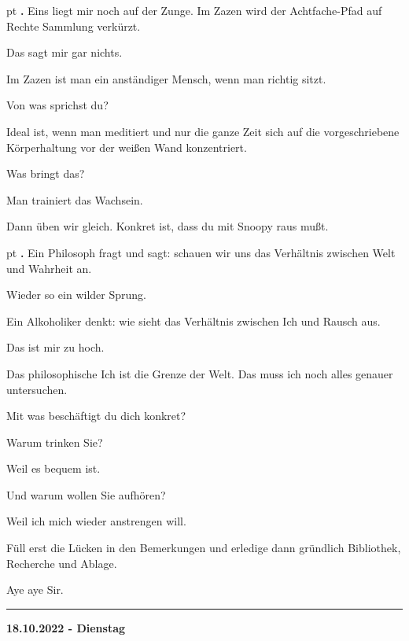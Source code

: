 \documentclass[10pt,a4paper]{article}
\newcounter{notec}
\newcommand\notep[1]{%
  \stepcounter{notec}
  \vskip #1pt
  {\bf\arabic{notec}.}
}
\newcommand\rele[1] {{\color {english} \bf {#1}}}         %
\newcommand\ddivide {\vskip -9pt \hrule \vskip 6pt}
\begin{document}
\begin{mdframed}[style=daystyle]
  \notep 4 Eins liegt mir noch auf der Zunge. Im Zazen wird der Achtfache-Pfad auf
  Rechte Sammlung verkürzt.

  \vskip 2pt
  Das sagt mir gar nichts.

  \vskip 2pt
  Im Zazen ist man ein anständiger Mensch, wenn man richtig sitzt.

  \vskip 2pt
  Von was sprichst du?

  \vskip 2pt
  Ideal ist, wenn man meditiert und nur die ganze Zeit sich auf die
  vorgeschriebene Körperhaltung vor der weißen Wand konzentriert.

  \vskip 2pt
  Was bringt das?

  \vskip 2pt
  Man trainiert das Wachsein.

  \vskip 2pt
  Dann üben wir gleich. Konkret ist, dass du mit Snoopy raus mußt.


  \notep 4 Ein Philosoph fragt und sagt: schauen wir uns das Verhältnis zwischen Welt und Wahrheit an.

  \vskip 2pt
  Wieder so ein wilder Sprung.

  \vskip 2pt
  Ein Alkoholiker denkt: wie sieht das Verhältnis zwischen Ich und Rausch aus.

  \vskip 2pt
  Das ist mir zu hoch.

  \vskip 2pt
  Das philosophische Ich ist die Grenze der Welt. Das muss ich noch alles genauer untersuchen.

  \vskip 2pt
  Mit was beschäftigt du dich konkret?

  \vskip 2pt
  Warum trinken Sie?

  \vskip 2pt
  Weil es bequem ist.

  \vskip 2pt
  Und warum wollen Sie aufhören?

  \vskip 2pt
  Weil ich mich wieder anstrengen will.

  \vskip 2pt
  Füll erst die Lücken in den Bemerkungen und erledige dann gründlich
  Bibliothek, Recherche und Ablage.

  \vskip 2pt
  Aye aye Sir.

\end{mdframed}


\ddivide
{\rele {18.10.2022 - Dienstag}}
       
\end{document}
